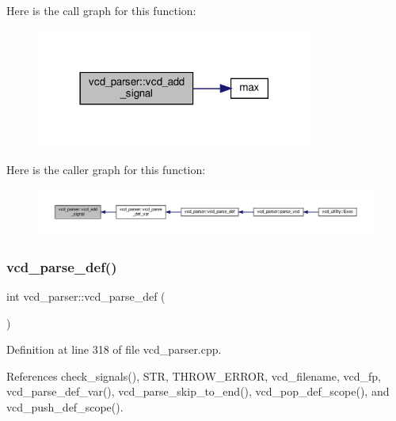 Here is the call graph for this function\+:
\nopagebreak
\begin{figure}[H]
\begin{center}
\leavevmode
\includegraphics[width=258pt]{d2/d25/classvcd__parser_a044276a15d40eb898d7b34584c11776c_cgraph}
\end{center}
\end{figure}
Here is the caller graph for this function\+:
\nopagebreak
\begin{figure}[H]
\begin{center}
\leavevmode
\includegraphics[width=350pt]{d2/d25/classvcd__parser_a044276a15d40eb898d7b34584c11776c_icgraph}
\end{center}
\end{figure}
\mbox{\label{classvcd__parser_af2b5f48a0d18667c418a500fb78b52e7}} 
\subsubsection{\texorpdfstring{vcd\+\_\+parse\+\_\+def()}{vcd\_parse\_def()}}
{\footnotesize\ttfamily int vcd\+\_\+parser\+::vcd\+\_\+parse\+\_\+def (\begin{DoxyParamCaption}{ }\end{DoxyParamCaption})\hspace{0.3cm}{\ttfamily [private]}}



Definition at line 318 of file vcd\+\_\+parser.\+cpp.



References check\+\_\+signals(), S\+TR, T\+H\+R\+O\+W\+\_\+\+E\+R\+R\+OR, vcd\+\_\+filename, vcd\+\_\+fp, vcd\+\_\+parse\+\_\+def\+\_\+var(), vcd\+\_\+parse\+\_\+skip\+\_\+to\+\_\+end(), vcd\+\_\+pop\+\_\+def\+\_\+scope(), and vcd\+\_\+push\+\_\+def\+\_\+scope().



